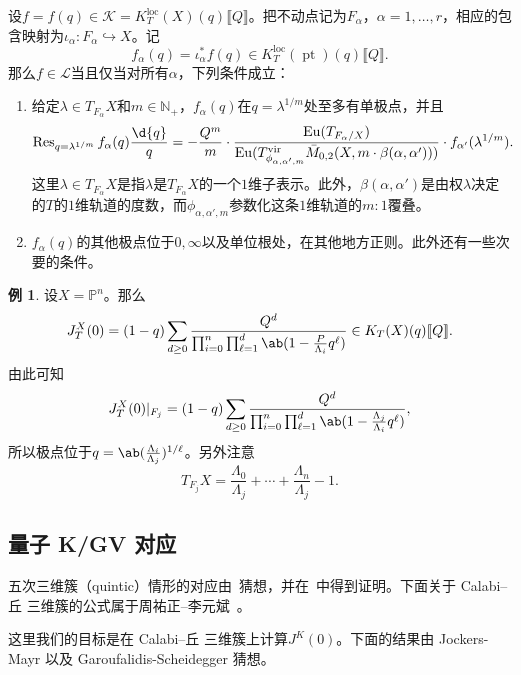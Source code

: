 \documentclass{amsart}
\theoremstyle{definition}
\newtheorem{exm}[thm]{例}
\theoremstyle{remark}
\theoremstyle{plain}
\theoremstyle{definition}
\theoremstyle{remark}
\newcommand{\N}{\mathbb{N}}
\renewcommand{\P}{\mathbb{P}}
\newcommand{\mc}[1]{\mathcal{#1}}
\newcommand{\mr}[1]{\mathrm{#1}}
\newcommand{\on}[1]{\operatorname{#1}}
\newcommand{\1}{\mathbf{1}}
\newcommand{\2}{\mathbf{2}}
\newcommand{\3}{\mathbf{3}}
\newcommand{\vir}{\mr{vir}}
\newcommand{\ps}[1]{\llbracket #1 \rrbracket}
\newcommand{\loc}{\mr{loc}}
\begin{document}
设\(f = f(q) \in \mc{K} = K_T^{\loc}(X)(q)\ps{Q}\)。把不动点记为\(F_{\alpha}\)，\(\alpha = 1, \ldots, r\)，相应的包含映射为\(\iota_{\alpha} \colon F_{\alpha} \hookrightarrow X\)。记
\[ f_{\alpha}(q) = \iota_{\alpha}^* f(q) \in K_T^{\loc}(\on{pt})(q)\ps{Q}. \]
那么\(f \in \mc{L}\)当且仅当对所有\(\alpha\)，下列条件成立：
\begin{enumerate}
    \item 给定\(\lambda \in T_{F_{\alpha}} X\)和\(m \in \N_+\)，\(f_{\alpha}(q)\)在\(q = \lambda^{1/m}\)处至多有单极点，并且
        \[ \on{Res}_{q = \lambda^{1/m}} f_{\alpha}(q) \frac{\d{q}}{q} = -\frac{Q^m}{m} \cdot \frac{\on{Eu}(T_{F_{\alpha}/X})}{\on{Eu}(T^{\vir}_{\phi_{\alpha,\alpha',m}}\bar{M}_{0,2}(X, m \cdot \beta(\alpha, \alpha')))} \cdot f_{\alpha'}(\lambda^{1/m}). \]
        这里\(\lambda \in T_{F_{\alpha}}X\)是指\(\lambda\)是\(T_{F_{\alpha}} X\)的一个\(1\)维子表示。此外，\(\beta(\alpha,\alpha')\)是由权\(\lambda\)决定的\(T\)的\(1\)维轨道的度数，而\(\phi_{\alpha, \alpha', m}\)参数化这条\(1\)维轨道的\(m:1\)覆叠。
    \item \(f_{\alpha}(q)\)的其他极点位于\(0, \infty\)以及单位根处，在其他地方正则。此外还有一些次要的条件。
\end{enumerate}

\begin{exm}
    设\(X = \P^n\)。那么
    \[ J_T^X(0) = (1-q) \sum_{d \geq 0} \frac{Q^d}{\prod_{i=0}^n \prod_{\ell = 1}^d \ab(1 - \frac{P}{\Lambda_i} q^{\ell})} \in K_T(X)(q) \ps{Q}. \]
    由此可知
    \[ J_T^X(0) |_{F_j} = (1-q) \sum_{d \geq 0} \frac{Q^d}{\prod_{i=0}^n \prod_{\ell = 1}^d \ab(1 - \frac{\Lambda_j}{\Lambda_i}q^{\ell})}, \]
    所以极点位于\(q = \ab(\frac{\Lambda_i}{\Lambda_j})^{1/\ell}\)。另外注意
    \[ T_{F_j} X = \frac{\Lambda_0}{\Lambda_j} + \cdots + \frac{\Lambda_n}{\Lambda_j} - 1. \]
\end{exm}

\subsection{量子 K/GV 对应}%
\label{sub:Quantum K/GV correspondence}

五次三维簇（quintic）情形的对应由~\cite{GaroufalidisScheidegger2022}猜想，并在~\cite{ChouLeeQuintic}中得到证明。下面关于 Calabi--丘 三维簇的公式属于周祐正--李元斌~\cite{ChouLee2025}。

这里我们的目标是在 Calabi--丘 三维簇上计算\(J^K(0)\)。下面的结果由 Jockers-Mayr 以及 Garoufalidis-Scheidegger 猜想。
\end{document}
